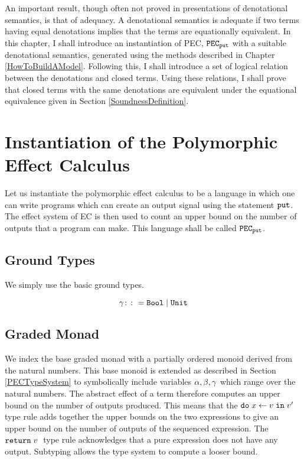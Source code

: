 

    An important result, though often not proved in presentations of denotational semantics, is that of adequacy. A denotational semantics is adequate if two terms having equal denotations implies that the terms are equationally equivalent. In this chapter, I shall introduce an instantiation of PEC,  $\texttt{PEC}_{\texttt{put}}$ with a suitable denotational semantics, generated using the methods described in Chapter \ref{HowToBuildAModel}. Following this, I shall introduce a set of logical relation between the denotations and closed terms. Using these relations, I shall prove that closed terms with the same denotations are equivalent under the equational equivalence given in Section \ref{SoundnessDefinition}.

    \section{Instantiation of the Polymorphic Effect Calculus}
    Let us instantiate the polymorphic effect calculus to be a language in which one can write programs which can create an output signal using the statement $\texttt{put}$. The effect system of EC is then used to count an upper bound on the number of outputs that a program can make. This language shall be called $\texttt{PEC}_{\texttt{put}}$.

    \subsection{Ground Types}
    We simply use the basic ground types.

    \begin{equation}
        \label{AdequacyGroundTypes}
        \gamma \colon\colon= \texttt{Bool} \mid \texttt{Unit}
    \end{equation}

    \subsection{Graded Monad}
    We index the base graded monad with a partially ordered monoid derived from the natural numbers. This base monoid is extended as described in Section \ref{PECTypeSystem} to symbolically include variables $\alpha, \beta, \gamma$ which range over the natural numbers. The abstract effect of a term therefore computes an upper bound on the number of outputs produced.  This means that the $\texttt{do}\; x \leftarrow v \;\texttt{in}\; v'\;$ type rule adds together the upper bounds on the two expressions to give an upper bound on the number of outputs of the sequenced expression. The $\texttt{return} \; v\;$ type rule acknowledges that a pure expression does not have any output. Subtyping  allows the type system to compute a looser bound.
    
